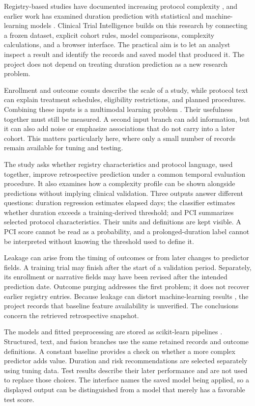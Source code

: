 \documentclass[10pt,letterpaper,twocolumn]{article}
\begin{document}
Registry-based studies have documented increasing protocol complexity \cite{markey}, and earlier work has examined duration prediction with statistical and machine-learning models \cite{cho}. Clinical Trial Intelligence builds on this research by connecting a frozen dataset, explicit cohort rules, model comparisons, complexity calculations, and a browser interface. The practical aim is to let an analyst inspect a result and identify the records and saved model that produced it. The project does not depend on treating duration prediction as a new research problem.

Enrollment and outcome counts describe the scale of a study, while protocol text can explain treatment schedules, eligibility restrictions, and planned procedures. Combining these inputs is a multimodal learning problem \cite{multimodal}. Their usefulness together must still be measured. A second input branch can add information, but it can also add noise or emphasize associations that do not carry into a later cohort. This matters particularly here, where only a small number of records remain available for tuning and testing.

The study asks whether registry characteristics and protocol language, used together, improve retrospective prediction under a common temporal evaluation procedure. It also examines how a complexity profile can be shown alongside predictions without implying clinical validation. Three outputs answer different questions: duration regression estimates elapsed days; the classifier estimates whether duration exceeds a training-derived threshold; and PCI summarizes selected protocol characteristics. Their units and definitions are kept visible. A PCI score cannot be read as a probability, and a prolonged-duration label cannot be interpreted without knowing the threshold used to define it.

Leakage can arise from the timing of outcomes or from later changes to predictor fields. A training trial may finish after the start of a validation period. Separately, its enrollment or narrative fields may have been revised after the intended prediction date. Outcome purging addresses the first problem; it does not recover earlier registry entries. Because leakage can distort machine-learning results \cite{leakage}, the project records that baseline feature availability is unverified. The conclusions concern the retrieved retrospective snapshot.

The models and fitted preprocessing are stored as scikit-learn pipelines \cite{sklearn}. Structured, text, and fusion branches use the same retained records and outcome definitions. A constant baseline provides a check on whether a more complex predictor adds value. Duration and risk recommendations are selected separately using tuning data. Test results describe their later performance and are not used to replace those choices. The interface names the saved model being applied, so a displayed output can be distinguished from a model that merely has a favorable test score.
\end{document}
